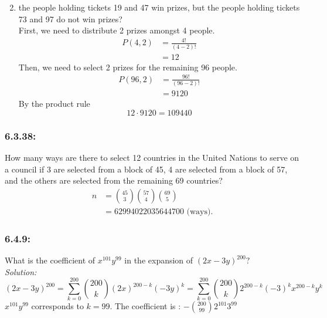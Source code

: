 \documentclass[a4paper]{article}
\begin{document}
\begin{enumerate}[label = \textbf{\alph*)}]
\begin{equation*}
		\end{equation*}
		\item the people holding tickets 19 and 47 win prizes, but the people holding tickets 73 and 97 do not win prizes? \\
		First, we need to distribute 2 prizes amongst 4 people.
		\begin{align*}
		P(4,2) & = \frac{4!}{(4-2)!} \\
		& = 12
		\end{align*}
		Then, we need to select 2 prizes for the remaining 96 people.
		\begin{align*}
		P(96,2) & = \frac{96!}{(96-2)!} \\
		& = 9120
		\end{align*}
		By the product rule
		\begin{equation*}
		12 \cdot 9120 = 109440
		\end{equation*}
	\end{enumerate}
	
	\subsubsection*{6.3.38:}
	How many ways are there to select 12 countries in the United Nations to serve on a council if 3 are selected from a block of 45, 4 are selected from a block of 57, and the others are selected from the remaining 69 countries?
	\begin{align*}
	n &=  {45 \choose 3}{57 \choose 4}{69 \choose 5} \\
	&=  62994022035644700 \text{ (ways).}
	\end{align*}
	
	\subsubsection*{6.4.9:}
	What is the coefficient of $x^{101}y^{99}$ in the expansion of $(2x - 3y)^{200} ?$\\
	\emph{Solution:}
	\begin{equation*}
	   (2x - 3y)^{200} = \sum_{k=0}^{200} {200 \choose k}(2x)^{200-k}(-3y)^{k} = \sum_{k=0}^{200} {200 \choose k} 2^{200-k}(-3)^{k} x^{200 -k}y^{k}
	\end{equation*}
	$x^{101}y^{99}$ corresponds to $k=99$. The coefficient is : $-{200 \choose 99}2^{101}3^{99}$
\end{document}
